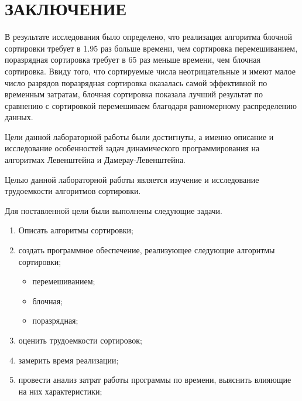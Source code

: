 \chapter*{\hfill{\centering  ЗАКЛЮЧЕНИЕ}\hfill}

В результате исследования было определено, что  реализация алгоритма  блочной сортировки требует в 1.95 раз больше  времени, чем сортировка перемешиванием, поразрядная сортировка требует в 65 раз меньше времени, чем блочная сортировка. Ввиду того, что сортируемые числа неотрицательные и имеют малое число разрядов поразрядная сортировка оказалась самой эффективной по временным затратам, блочная сортировка показала лучший результат по сравнению с сортировкой перемешиваем благодаря равномерному распределению данных.



Цели данной лабораторной работы были достигнуты, а именно описание и исследование особенностей задач динамического программирования на алгоритмах Левенштейна и Дамерау-Левенштейна.

Целью данной лабораторной работы является изучение и исследование трудоемкости алгоритмов сортировки.

Для поставленной цели были выполнены следующие задачи.
\begin{enumerate}
	\item Описать алгоритмы сортировки;
	\item создать программное обеспечение, реализующее следующие алгоритмы сортировки;
	\begin{itemize}
		\item перемешиванием;
		\item блочная;
		\item поразрядная;
	\end{itemize}
	\item оценить трудоемкости сортировок;
	\item замерить время реализации;
	\item провести анализ затрат работы программы по времени, выяснить влияющие на них характеристики;
\end{enumerate}
